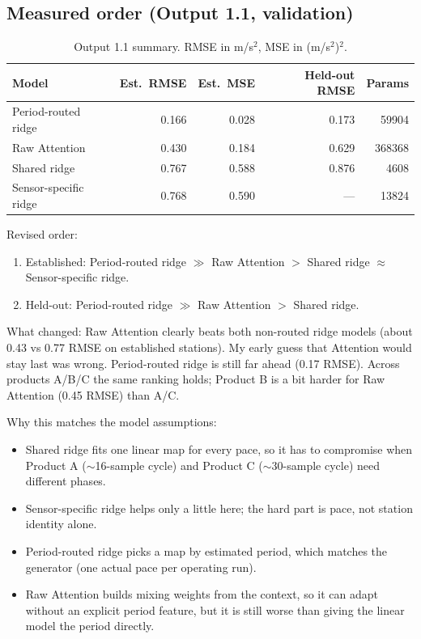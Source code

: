 \documentclass[11pt,a4paper]{article}
\begin{document}
\subsection*{Measured order (Output 1.1, validation)}
\begin{table}[H]
\centering
\small
\begin{tabular}{lrrrr}
\toprule
Model & Est.\ RMSE & Est.\ MSE & Held-out RMSE & Params \\
\midrule
Period-routed ridge & 0.166 & 0.028 & 0.173 & 59904 \\
Raw Attention & 0.430 & 0.184 & 0.629 & 368368 \\
Shared ridge & 0.767 & 0.588 & 0.876 & 4608 \\
Sensor-specific ridge & 0.768 & 0.590 & --- & 13824 \\
\bottomrule
\end{tabular}
\caption{Output 1.1 summary. RMSE in m/s$^2$, MSE in (m/s$^2$)$^2$.}
\end{table}

Revised order:
\begin{enumerate}
  \item Established: Period-routed ridge $\gg$ Raw Attention $>$ Shared ridge $\approx$ Sensor-specific ridge.
  \item Held-out: Period-routed ridge $\gg$ Raw Attention $>$ Shared ridge.
\end{enumerate}

What changed: Raw Attention clearly beats both non-routed ridge models (about 0.43 vs 0.77 RMSE on established stations). My early guess that Attention would stay last was wrong. Period-routed ridge is still far ahead (0.17 RMSE). Across products A/B/C the same ranking holds; Product B is a bit harder for Raw Attention (0.45 RMSE) than A/C.

Why this matches the model assumptions:
\begin{itemize}
  \item Shared ridge fits one linear map for every pace, so it has to compromise when Product A ($\sim$16-sample cycle) and Product C ($\sim$30-sample cycle) need different phases.
  \item Sensor-specific ridge helps only a little here; the hard part is pace, not station identity alone.
  \item Period-routed ridge picks a map by estimated period, which matches the generator (one actual pace per operating run).
  \item Raw Attention builds mixing weights from the context, so it can adapt without an explicit period feature, but it is still worse than giving the linear model the period directly.
\end{itemize}
\end{document}
